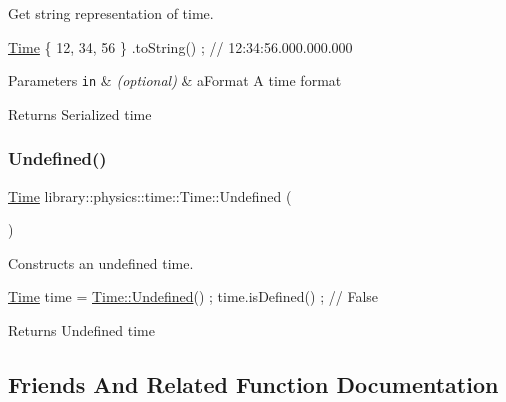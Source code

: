 Get string representation of time. 


\begin{DoxyCode}
\hyperlink{classlibrary_1_1physics_1_1time_1_1_time_a46a4b9be1451041ae65332f04db21c4b}{Time} \{ 12, 34, 56 \} .toString() ; \textcolor{comment}{// 12:34:56.000.000.000}
\end{DoxyCode}



\begin{DoxyParams}[1]{Parameters}
\mbox{\tt in}  & {\em (optional)} & a\+Format A time format \\
\hline
\end{DoxyParams}
\begin{DoxyReturn}{Returns}
Serialized time 
\end{DoxyReturn}
\mbox{\label{classlibrary_1_1physics_1_1time_1_1_time_a6e8c7e4ea2d05a7c0a9e5e045ef45520}} 
\subsubsection{\texorpdfstring{Undefined()}{Undefined()}}
{\footnotesize\ttfamily \hyperlink{classlibrary_1_1physics_1_1time_1_1_time}{Time} library\+::physics\+::time\+::\+Time\+::\+Undefined (\begin{DoxyParamCaption}{ }\end{DoxyParamCaption})\hspace{0.3cm}{\ttfamily [static]}}



Constructs an undefined time. 


\begin{DoxyCode}
\hyperlink{classlibrary_1_1physics_1_1time_1_1_time_a46a4b9be1451041ae65332f04db21c4b}{Time} time = \hyperlink{classlibrary_1_1physics_1_1time_1_1_time_a6e8c7e4ea2d05a7c0a9e5e045ef45520}{Time::Undefined}() ;
time.isDefined() ; \textcolor{comment}{// False}
\end{DoxyCode}


\begin{DoxyReturn}{Returns}
Undefined time 
\end{DoxyReturn}


\subsection{Friends And Related Function Documentation}
\mbox{\label{classlibrary_1_1physics_1_1time_1_1_time_a181948621d8fe0d85bdfc97af30b62fb}} 
